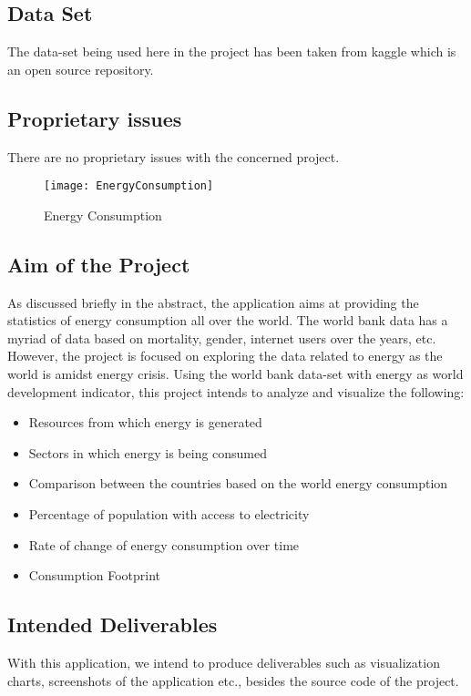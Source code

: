 \documentclass{sig-alternate-05-2015}
\begin{document}
\subsection{Data Set}
The data-set being used here in the project has been taken from kaggle which is an open source repository. \cite{www-kaggle}

\subsection{Proprietary issues}
There are no proprietary issues with the concerned project. 

\begin{figure}
\centering
\texttt{[image: EnergyConsumption]}
\caption{Energy Consumption}
\cite{www-image}
\end{figure}


\subsection{Aim of the Project}
As discussed briefly in the abstract, the application aims at providing the statistics of energy consumption all over the world. The world bank data has a myriad of data based on mortality, gender, internet users over the years, etc. However, the project is focused on exploring the data related to energy as the world is amidst energy crisis. Using the world bank data-set with energy as world development indicator, this project intends to analyze and visualize the following:
\begin{itemize}
\item Resources from which energy is generated
\item Sectors in which energy is being consumed 
\item Comparison between the countries based on the world energy consumption 
\item Percentage of population with access to electricity 
\item Rate of change of energy consumption over time
\item Consumption Footprint
\\
\end{itemize}


\subsection{Intended Deliverables}
With this application, we intend to produce deliverables such as visualization charts, screenshots of the application etc., besides the source code of the project.
\\
\end{document}
